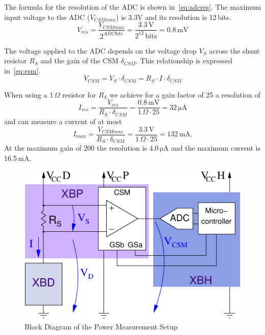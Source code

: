 \documentclass[twoside,11pt]{cergdoc}
\begin{document}
The formula for the resolution of the ADC is shown in~\eqref{eq:adcres}. The maximum input voltage
to the ADC ($V_{CSMmax}$) is 3.3V and its resolution is 12\,bits. 
\begin{equation}
  V_{res}=\frac{V_{CSMmax}}{2^{ADCbits}} = \frac{3.3\,\mathrm{V}}{2^{12}\,\mathrm{bits}} = 0.8\,\mathrm{mV} \label{eq:adcres}
\end{equation}

The voltage applied to the ADC depends on the voltage drop $V_S$ across the shunt resistor
$R_S$ and the gain of the CSM $\delta_{CSM}$. This relationship is expressed in~\eqref{eq:csm}.
\begin{equation}
  V_{CSM} = V_S \cdot \delta_{CSM} = R_S \cdot I \cdot \delta_{CSM} \label{eq:csm}
\end{equation}

When using a 1\,$\Omega$ resistor for $R_S$ we achieve for a gain factor of 25 a resolution of
%
\[I_{res} = \frac{V_{res}}{R_S \cdot \delta_{CSM}} = \frac{0.8\,\mathrm{mV}}{1\,\Omega \cdot 25} = 32\,\mathrm{\mu A}\]
%
and can measure a current of at most
%
\[I_{max} = \frac{V_{CSMmax}}{R_S \cdot \delta_{CSM}} = \frac{3.3\,\mathrm{V}}{1\,\Omega \cdot 25} = 132\,\mathrm{mA}.\]
%
%
At the maximum gain of 200 the resolution is $4.0\,\mathrm{\mu A}$ and the maximum current is 16.5\,mA.


\begin{figure}[ht]
  \begin{center}
    \includegraphics[scale=1]{figures/ina225}
    \caption{Block Diagram of the Power Measurement Setup}\label{fig:block}
  \end{center}
\end{figure}
\end{document}
